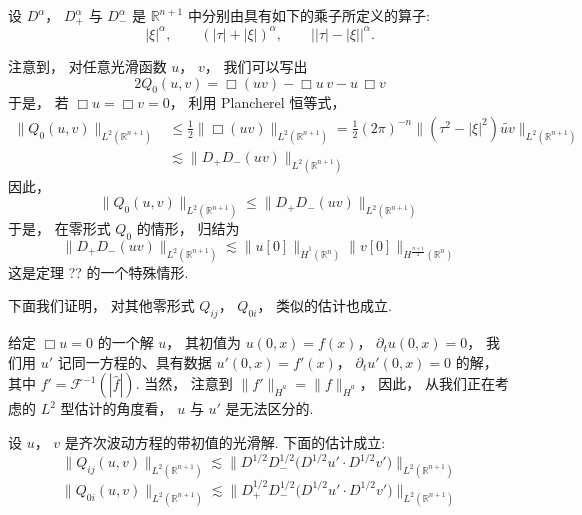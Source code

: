 \begin{definition}\label{def:c9-3.4}
设 $D^{\alpha}$， $D_+^{\alpha}$ 与 $D_-^{\alpha}$ 是 $\mathbb{R}^{n+1}$ 中分别由具有如下的乘子所定义的算子:
\[
|\xi|^{\alpha}, \qquad (|\tau| + |\xi|)^{\alpha}, \qquad \big||\tau| - |\xi|\big|^{\alpha}.
\]
\end{definition}

注意到， 对任意光滑函数 $u$， $v$， 我们可以写出
\[
2Q_0(u, v) = \Box(uv) - \Box u\, v - u\, \Box v
\]
于是， 若 $\Box u = \Box v = 0$， 利用 Plancherel 恒等式，
\[
\begin{aligned}
\|Q_0(u, v)\|_{L^2(\mathbb{R}^{n+1})} &\leq \frac{1}{2}\|\Box(uv)\|_{L^2(\mathbb{R}^{n+1})} = \frac{1}{2}(2\pi)^{-n}\|(\tau^2 - |\xi|^2)\widetilde{uv}\|_{L^2(\mathbb{R}^{n+1})}\\
&\lesssim \|D_+ D_-(uv)\|_{L^2(\mathbb{R}^{n+1})}
\end{aligned}
\]
因此，
\begin{equation}
\|Q_0(u, v)\|_{L^2(\mathbb{R}^{n+1})} \leq \|D_+ D_-(uv)\|_{L^2(\mathbb{R}^{n+1})}\label{eq:c9-395}
\end{equation}
于是， 在零形式 $Q_0$ 的情形，  归结为
\begin{equation}
\|D_+ D_-(uv)\|_{L^2(\mathbb{R}^{n+1})} \lesssim \|u[0]\|_{\dot H^1(\mathbb{R}^n)}\|v[0]\|_{H^{\frac{n+1}{2}}(\mathbb{R}^n)}\label{eq:c9-396}
\end{equation}
这是定理 ?? 的一个特殊情形.

下面我们证明， 对其他零形式 $Q_{ij}$， $Q_{0i}$， 类似的估计也成立.

\begin{remark}\label{rem:c9-3.5}
给定 $\Box u = 0$ 的一个解 $u$， 其初值为 $u(0, x) = f(x)$， $\partial_t u(0, x) = 0$， 我们用 $u'$ 记同一方程的、具有数据 $u'(0, x) = f'(x)$， $\partial_t u'(0, x) = 0$ 的解， 其中 $f' = \mathcal{F}^{-1}(|\hat f|)$. 当然， 注意到 $\|f'\|_{\dot H^a} = \|f\|_{\dot H^a}$， 因此， 从我们正在考虑的 $L^2$ 型估计的角度看， $u$ 与 $u'$ 是无法区分的.
\end{remark}

\begin{proposition}\label{prop:c9-3.6}
设 $u$， $v$ 是齐次波动方程的带初值的光滑解. 下面的估计成立:
\begin{equation}
\|Q_{ij}(u, v)\|_{L^2(\mathbb{R}^{n+1})} \lesssim \|D^{1/2}D_-^{1/2}\big(D^{1/2}u'\cdot D^{1/2}v'\big)\|_{L^2(\mathbb{R}^{n+1})}\label{eq:c9-397}
\end{equation}
\begin{equation}
\|Q_{0i}(u, v)\|_{L^2(\mathbb{R}^{n+1})} \lesssim \|D_+^{1/2}D_-^{1/2}\big(D^{1/2}u'\cdot D^{1/2}v'\big)\|_{L^2(\mathbb{R}^{n+1})}\label{eq:c9-398}
\end{equation}
\end{proposition}

